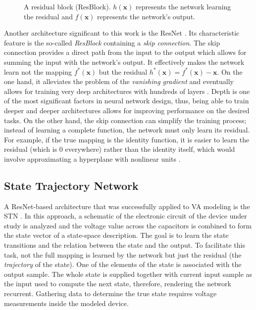 \begin{figure}
  \centering
  
  \caption{A residual block (ResBlock). $h(\pmb{x})$ represents the network learning the residual and $f(\pmb{x})$ represents the network's output.}
\end{figure}

Another architecture significant to this work is the \ac{ResNet} \cite{He2015}. Its characteristic feature is the so-called \emph{\ac{ResBlock}} containing a \emph{skip connection}. The skip connection provides a direct path from the input to the output which allows for summing the input with the network's output. It effectively makes the network learn not the mapping $f^*(\pmb{x})$ but the residual $h^*(\pmb{x}) = f^*(\pmb{x}) - \pmb{x}$. On the one hand, it alleviates the problem of the \emph{vanishing gradient} \cite{Goodfellow-et-al-2016} and eventually allows for training very deep architectures with hundreds of layers \cite{He2015}. Depth is one of the most significant factors in neural network design, thus, being able to train deeper and deeper architectures allows for improving performance on the desired tasks. On the other hand, the skip connection can simplify the training process; instead of learning a complete function, the network must only learn its residual. For example, if the true mapping is the identity function, it is easier to learn the residual (which is $0$ everywhere) rather than the identity itself, which would involve approximating a hyperplane with nonlinear units \cite{He2015}.

\subsection*{State Trajectory Network}

A \ac{ResNet}-based architecture that was successfully applied to \ac{VA} modeling is the \acf{STN} \cite{Parker2019}. In this approach, a schematic of the electronic circuit of the device under study is analyzed and the voltage value across the capacitors is combined to form the state vector of a state-space description. The goal is to learn the state transitions and the relation between the state and the output. To facilitate this task, not the full mapping is learned by the network but just the residual (the \emph{trajectory} of the state). One of the elements of the state is associated with the output sample. The whole state is supplied together with current input sample as the input used to compute the next state, therefore, rendering the network recurrent. Gathering data to determine the true state requires voltage measurements inside the modeled device. 


